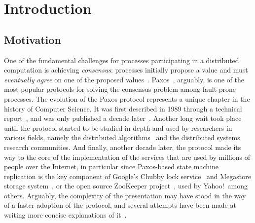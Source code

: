 
\chapter{Introduction}
\section{Motivation}
One of the fundamental challenges for processes participating in a distributed computation is achieving \emph{consensus}: processes initially propose a value and must 
\emph{eventually agree} on one of the proposed values~\cite{FLP85}. Paxos~\cite{Lam98}, arguably, is one of the most popular protocols for solving the consensus problem among fault-prone processes. The evolution of the Paxos protocol represents a unique
chapter in the history of Computer Science. It was first described in 1989 through a technical report~\cite{paxos:tr}, and was only published a decade later~\cite{Lam98}. Another long wait took place until the protocol started to be studied in depth and used by
researchers in various fields, namely the distributed
algorithms~\cite{DPLL97} and the distributed systems~\cite{petal} research communities. And finally, another decade later, the protocol made its way to the core of the implementation of the services that are used by millions of people over the Internet, in particular since Paxos-based state machine replication is the key component of Google's Chubby lock service~\cite{chubby} and Megastore storage system~\cite{36971}, or the open source ZooKeeper project~\cite{zookeeper}, used by Yahoo!\ among others. Arguably, the complexity of the presentation may have stood in the way of a faster
adoption of the protocol, and several attempts have been made at writing more concise explanations of it~\cite{L01,Renesse2011}.


